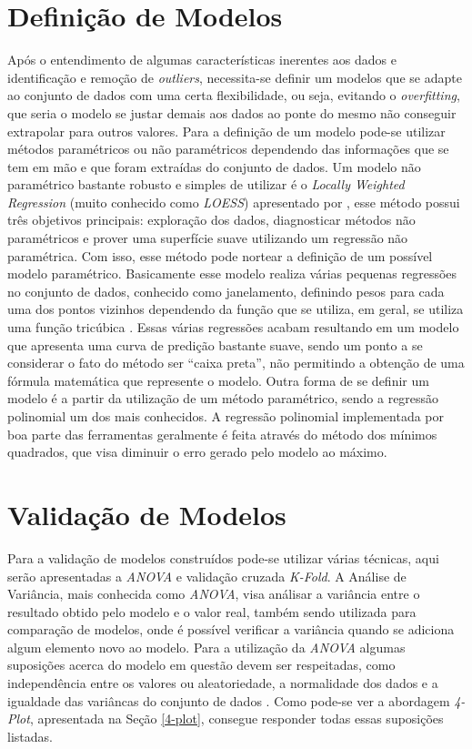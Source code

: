 \section{Definição de Modelos}\label{defmodels}

Após o entendimento de algumas características inerentes aos dados e
identificação e remoção de \textit{outliers}, necessita-se definir um modelos
que se adapte ao conjunto de dados com uma certa flexibilidade, ou seja,
evitando o \textit{overfitting}, que seria o modelo se justar demais aos dados
ao ponte do mesmo não conseguir extrapolar para outros valores. Para a definição
de um modelo pode-se utilizar métodos paramétricos ou não paramétricos
dependendo das informações que se tem em mão e que foram extraídas do conjunto
de dados. Um modelo não paramétrico bastante robusto e simples de utilizar é o
\textit{Locally Weighted Regression} (muito conhecido como \textit{LOESS})
apresentado por , esse método possui três objetivos
principais: exploração dos dados, diagnosticar métodos não paramétricos e prover
uma superfície suave utilizando um regressão não paramétrica. Com isso, esse
método pode nortear a definição de um possível modelo paramétrico. Basicamente
esse modelo realiza várias pequenas regressões no conjunto de dados, conhecido
como janelamento, definindo pesos para cada uma dos pontos vizinhos dependendo da
função que se utiliza, em geral, se utiliza uma função tricúbica
\cite{cleveland:1988}. Essas várias regressões acabam resultando em um modelo
que apresenta uma curva de predição bastante suave, sendo um ponto a se
considerar o fato do método ser ``caixa preta'', não permitindo a obtenção de
uma fórmula matemática que represente o modelo. Outra forma de se definir um
modelo é a partir da utilização de um método paramétrico, sendo a regressão
polinomial um dos mais conhecidos. A regressão polinomial implementada por boa
parte das ferramentas geralmente é feita através do método dos mínimos
quadrados, que visa diminuir o erro gerado pelo modelo ao máximo.

\section{Validação de Modelos}\label{valmodels}

Para a validação de modelos construídos pode-se utilizar várias técnicas, aqui
serão apresentadas a \textit{ANOVA} e validação cruzada \textit{K-Fold}. A
Análise de Variância, mais conhecida como \textit{ANOVA}, visa análisar a
variância entre o resultado obtido pelo modelo e o valor real, também sendo
utilizada para comparação de modelos, onde é possível verificar a variância
quando se adiciona algum elemento novo ao modelo. Para a utilização da
\textit{ANOVA} algumas suposições acerca do modelo em questão devem ser
respeitadas, como independência entre os valores ou aleatoriedade, a normalidade
dos dados e a igualdade das variâncas do conjunto de dados \cite{snedecor:1967}.
Como pode-se ver a abordagem \textit{4-Plot}, apresentada na Seção \ref{4-plot},
consegue responder todas essas suposições listadas. 

